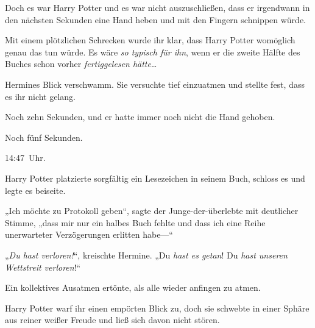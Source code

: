 Doch es war Harry Potter und es war nicht auszuschließen, dass er irgendwann in den nächsten Sekunden eine Hand heben und mit den Fingern schnippen würde.

Mit einem plötzlichen Schrecken wurde ihr klar, dass Harry Potter womöglich genau das tun würde. Es wäre \emph{so typisch für ihn}, wenn er die zweite Hälfte des Buches schon vorher \emph{fertiggelesen hätte}…

Hermines Blick verschwamm. Sie versuchte tief einzuatmen und stellte fest, dass es ihr nicht gelang.

Noch zehn Sekunden, und er hatte immer noch nicht die Hand gehoben.

Noch fünf Sekunden.

14:47~Uhr.

Harry Potter platzierte sorgfältig ein Lesezeichen in seinem Buch, schloss es und legte es beiseite.

„Ich möchte zu Protokoll geben“, sagte der Junge-der-überlebte mit deutlicher Stimme, „dass mir nur ein halbes Buch fehlte und dass ich eine Reihe unerwarteter Verzögerungen erlitten habe—“

„\emph{Du hast verloren!}“, kreischte Hermine. „Du \emph{hast es getan}! Du \emph{hast unseren Wettstreit verloren}!“

Ein kollektives Ausatmen ertönte, als alle wieder anfingen zu atmen.

Harry Potter warf ihr einen empörten Blick zu, doch sie schwebte in einer Sphäre aus reiner weißer Freude und ließ sich davon nicht stören.

